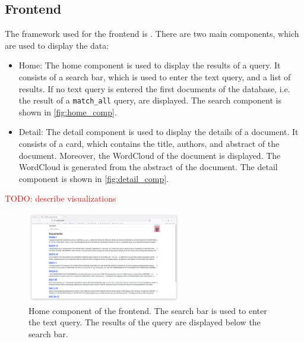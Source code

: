 \subsection{Frontend}\label{subsec:frontend}

The framework used for the frontend is \angular{}.
There are two main components, which are used to display the data:

\begin{itemize}
    \item \label{pt:home}Home: 
        The home component is used to display the results of a query.
        It consists of a search bar, which is used to enter the text query, and a list of results.
        If no text query is entered the first documents of the database, i.e. the result of a \texttt{match\_all} query, are displayed.
        The search component is shown in \autoref{fig:home_comp}.

    \item \label{pt:detail}Detail: 
        The detail component is used to display the details of a document.
        It consists of a card, which contains the title, authors, and abstract of the document.
        Moreover, the WordCloud of the document is displayed.
        The WordCloud is generated from the abstract of the document.
        The detail component is shown in \autoref{fig:detail_comp}.
\end{itemize}

\textcolor{red}{TODO: describe visualizations}


\begin{figure}[htp] %
    \centering
    \includegraphics[width=0.6\textwidth]{images/UI/Home_component.png}
    \caption{Home component of the frontend.
    The search bar is used to enter the text query.
    The results of the query are displayed below the search bar.
    }
    \label{fig:home_comp}
\end{figure}


